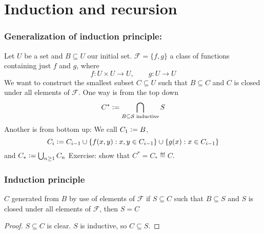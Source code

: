 \section{Induction and recursion}
\subsubsection*{Generalization of induction principle:}
Let $U$ be a set and $B\subseteq U$ our initial set.
$\mathcal{F} = \{f,g\}$ a class of functions containing just $f$ and $g$, where $$f:U\times U\to U, \qquad g: U\to U$$
We want to construct the smallest subset $C\subseteq U$ such that $B\subseteq C$ and $C$ is closed under all elements of $\mathcal{F}$.
\noindent One way is from the top down $$C^* \vcentcolon= \bigcap_{B\subseteq \mathcal{S} \text{ inductive}}{S}$$
Another is from bottom up: We call $C_1 \vcentcolon= B$, 
$$C_i \vcentcolon= C_{i-1} \cup \{f(x,y) : x,y\in C_{i-1}\}\cup \{g(x) : x\in C_{i-1}\}$$
and $C_* \vcentcolon= \bigcup_{n\geq 1}{C_{n}}$
Exercise: show that $C^* = C_*\eqdef C$.
\subsubsection*{Induction principle}
$C$ generated from $B$ by use of elements of $\mathcal{F}$ if $S\subseteq C$ such that $B\subseteq S$ and $S$ is closed under all
elements of $\mathcal{F}$, then $S = C$
\begin{proof}
    $S\subseteq C$ is clear.
    $S$ is inductive, so $C\subseteq S$.
\end{proof}

